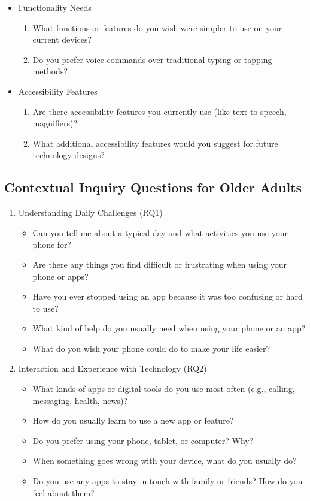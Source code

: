 \documentclass[acmlarge]{acmart}
\begin{document}
{\begin{itemize}
    \item Functionality Needs
    \begin{enumerate}
        \item What functions or features do you wish were simpler to use on your current devices?
        \item Do you prefer voice commands over traditional typing or tapping methods?
    \end{enumerate}
    
    \item Accessibility Features
    \begin{enumerate}
        \item Are there accessibility features you currently use (like text-to-speech, magnifiers)?
        \item What additional accessibility features would you suggest for future technology designs?
    \end{enumerate}
\end{itemize}

\subsection{Contextual Inquiry Questions for Older Adults}
\begin{enumerate}
    \item Understanding Daily Challenges (RQ1)
    \begin{itemize}
        \item Can you tell me about a typical day and what activities you use your phone for?
        \item Are there any things you find difficult or frustrating when using your phone or apps?
        \item Have you ever stopped using an app because it was too confusing or hard to use?
        \item What kind of help do you usually need when using your phone or an app?
        \item What do you wish your phone could do to make your life easier?
    \end{itemize}
    
    \item Interaction and Experience with Technology (RQ2)
    \begin{itemize}
        \item What kinds of apps or digital tools do you use most often (e.g., calling, messaging, health, news)?
        \item How do you usually learn to use a new app or feature?
        \item Do you prefer using your phone, tablet, or computer? Why?
        \item When something goes wrong with your device, what do you usually do?
        \item Do you use any apps to stay in touch with family or friends? How do you feel about them?
    \end{itemize}
    

\end{enumerate}}
\end{document}
